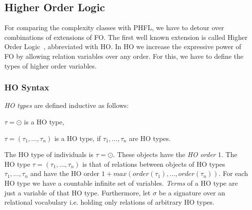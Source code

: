 

\subsection{Higher Order Logic}\label{subsec:higherOrderLogic}

For comparing the complexity classes with PHFL, we have to detour over combinations of extensions of FO. The first well
known extension is called Higher Order Logic~\cite{vanBenthem2001higher}, abbreviated with HO. In HO we
increase the expressive power of FO by allowing relation variables over any order. For this, we have to define the
types of higher order variables.

\subsubsection{HO Syntax}

\begin{definition}
    \emph{HO types} are defined inductive as follows:
    \begin{compactitem}
        \item $\tau = \odot$ is a HO type,
        \item $\tau = (\tau_1, \dots, \tau_n)$ is a HO type, if $\tau_1, \dots, \tau_n$ are
        HO types.
    \end{compactitem}
\end{definition}

The HO type of individuals is $\tau = \odot$. These objects have the \textit{HO order} $1$. The HO type $\tau = (\tau_1,
\dots, \tau_n)$ is that of relations between objects of HO types $\tau_1, \dots, \tau_n$ and have the HO order $1 + max
(order(\tau_1), \dots, order(\tau_n))$. For each HO type we have a countable infinite set of variables.
\textit{Terms} of a HO type are just a variable of that HO type. Furthermore, let $\sigma$ be a signature over an
relational vocabulary i.e. holding only relations of arbitrary HO types.

